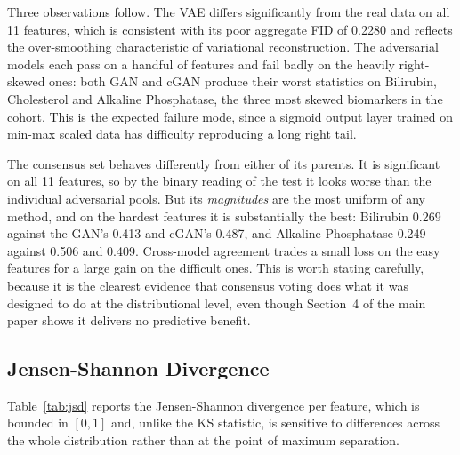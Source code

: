 \documentclass[manuscript,review,screen,nonacm]{acmart}
\newif\ifshowrevisions
\DeclareRobustCommand{\rev}[1]{\ifshowrevisions{\color{revisionblue}#1}\else#1\fi}
\begin{document}
Three observations follow. The VAE differs significantly from the real data on all 11 features, which is consistent with its poor aggregate FID of 0.2280 and reflects the over-smoothing characteristic of variational reconstruction. The adversarial models each pass on a handful of features and fail badly on the heavily right-skewed ones: both GAN and cGAN produce their worst statistics on Bilirubin, Cholesterol and Alkaline Phosphatase, the three most skewed biomarkers in the cohort. This is the expected failure mode, since a sigmoid output layer trained on min-max scaled data has difficulty reproducing a long right tail.

\rev{The consensus set behaves differently from either of its parents. It is significant on all 11 features, so by the binary reading of the test it looks worse than the individual adversarial pools. But its \emph{magnitudes} are the most uniform of any method, and on the hardest features it is substantially the best: Bilirubin 0.269 against the GAN's 0.413 and cGAN's 0.487, and Alkaline Phosphatase 0.249 against 0.506 and 0.409. Cross-model agreement trades a small loss on the easy features for a large gain on the difficult ones. This is worth stating carefully, because it is the clearest evidence that consensus voting does what it was designed to do at the distributional level, even though Section~4 of the main paper shows it delivers no predictive benefit.}

\subsection{Jensen-Shannon Divergence}

Table~\ref{tab:jsd} reports the Jensen-Shannon divergence per feature, which is bounded in $[0,1]$ and, unlike the KS statistic, is sensitive to differences across the whole distribution rather than at the point of maximum separation.
\end{document}
